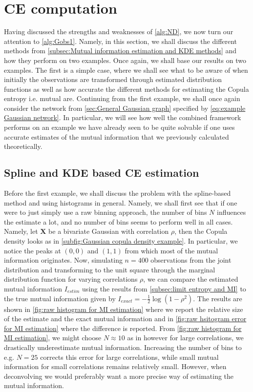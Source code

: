 \documentclass[../Thesis.tex]{subfiles}
\begin{document}
\section{CE computation}\label{sec:gaussian MI error}
Having discussed the strengths and weaknesses of \autoref{alg:ND}, we now turn our attention to \autoref{alg:Gobs1}. Namely, in this section, we shall discuss the different methods from \autoref{subsec:Mutual information estimation and KDE methods} and how they perform on two examples. Once again, we shall base our results on two examples. The first is a simple case, where we shall see what to be aware of when initially the observations are transformed through estimated distribution functions as well as how accurate the different methods for estimating the Copula entropy i.e. mutual are. Continuing from the first example, we shall once again consider the network from \autoref{sec:General Gaussian graph} specified by \autoref{eq:example Gaussian network}. In particular, we will see how well the combined framework performs on an example we have already seen to be quite solvable if one uses accurate estimates of the mutual information that we previously calculated theoretically.



\subsection{Spline and KDE based CE estimation}\label{subsec:Spline and KDE based CE estimation}
Before the first example, we shall discuss the problem with the spline-based method and using histograms in general. Namely, we shall first see that if one were to just simply use a raw binning approach, the number of bins $N$ influences the estimate a lot, and no number of bins seems to perform well in all cases. Namely, let $\boldsymbol X$ be a bivariate Gaussian with correlation $\rho$, then the Copula density looks as in \autoref{subfig:Gaussian copula density example}. In particular, we notice the peaks at $(0,0)$ and $(1,1)$ from which most of the mutual information originates. Now, simulating $n = 400$ observations from the joint distribution and transforming to the unit square through the marginal distribution function for varying correlations $\rho$, we can compare the estimated mutual information $I_{estim}$ using the results from \autoref{subsec:limit entropy and MI} to the true mutual information given by $ I_{exact} = - \frac{1}{2} \log \left(1 - \rho^2\right)$. The results are shown in \autoref{fig:raw histogram for MI estimation} where we report the relative size of the estimate and the exact mutual information and in \autoref{fig:raw hsitogram error for MI estimation} where the difference is reported. From \autoref{fig:raw histogram for MI estimation}, we might choose $N \approx 10$ as in \cite{Network-deconvolution-as-a-general-method-to-distinguish-direct-dependencies-in-networks} however for large correlations, we drastically underestimate mutual information. Increasing the number of bins to e.g. $N = 25$ corrects this error for large correlations, while small mutual information for small correlations remains relatively small. However, when deconvolving we would preferably want a more precise way of estimating the mutual information.
\end{document}
